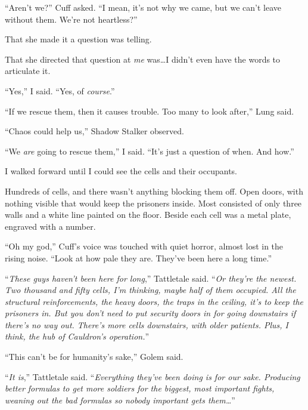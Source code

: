 ``Aren't we?'' Cuff asked.  ``I mean, it's not why we came, but we can't leave without them.  We're not heartless?''



That she made it a question was telling.



That she directed that question at \emph{me} was\ldots I didn't even have the words to articulate it.



``Yes,'' I said.  ``Yes, of \emph{course}.''



``If we rescue them, then it causes trouble.  Too many to look after,'' Lung said.



``Chaos could help us,'' Shadow Stalker observed.



``We \emph{are} going to rescue them,'' I said.  ``It's just a question of when.  And how.''



I walked forward until I could see the cells and their occupants.



Hundreds of cells, and there wasn't anything blocking them off.  Open doors, with nothing visible that would keep the prisoners inside.  Most consisted of only three walls and a white line painted on the floor.  Beside each cell was a metal plate, engraved with a number.



``Oh my god,'' Cuff's voice was touched with quiet horror, almost lost in the rising noise.  ``Look at how pale they are.  They've been here a long time.''



``\emph{These guys haven't been here for long},'' Tattletale said.  ``\emph{Or they're the newest.  Two thousand and fifty cells, I'm thinking, maybe half of them occupied.  All the structural reinforcements, the heavy doors, the traps in the ceiling, it's to keep the prisoners in.  But you don't need to put security doors in for going downstairs if there's no way out.  There's more cells downstairs, with older patients.  Plus, I think, the hub of Cauldron's operation.}''



``This can't be for humanity's sake,'' Golem said.



``\emph{It is},'' Tattletale said.  ``\emph{Everything they've been doing is for our sake.  Producing better formulas to get more soldiers for the biggest, most important fights, weaning out the bad formulas so nobody important gets them\ldots}''




